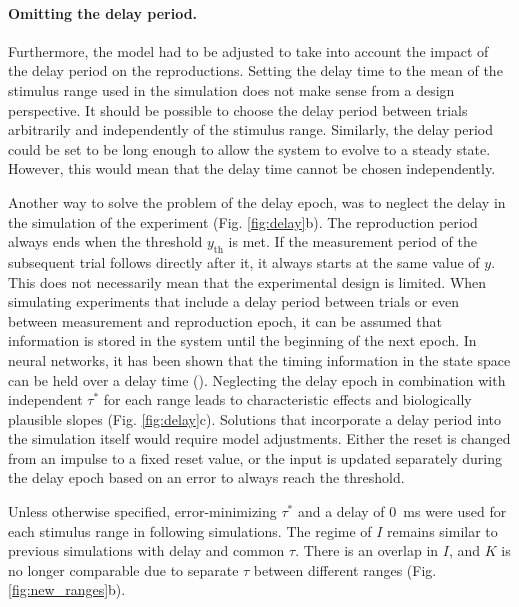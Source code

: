 \documentclass[10pt, a4paper]{article}
\begin{document}
\paragraph{Omitting the delay period.}
Furthermore, the model had to be adjusted to take into account the impact of the delay period on the reproductions. 
Setting the delay time to the mean of the stimulus range used in the simulation does not make sense from a design perspective. It should be possible to choose the delay period between trials arbitrarily and independently of the stimulus range. 
Similarly, the delay period could be set to be long enough to allow the system to evolve to a steady state. However, this would mean that the delay time cannot be chosen independently.

Another way to solve the problem of the delay epoch, was to neglect the delay in the simulation of the experiment (Fig. \ref{fig:delay}b).
The reproduction period always ends when the threshold $y_\text{th}$ is met. If the measurement period of the subsequent trial follows directly after it, it always starts at the same value of $y$. 
This does not necessarily mean that the experimental design is limited. When simulating experiments that include a delay period between trials or even between measurement and reproduction epoch, it can be assumed that information is stored in the system until the beginning of the next epoch. 
In neural networks, it has been shown that the timing information in the state space can be held over a delay time (\cite{Bi2020}).
Neglecting the delay epoch in combination with independent $\tau^*$ for each range leads to characteristic effects and biologically plausible slopes (Fig. \ref{fig:delay}c).
Solutions that incorporate a delay period into the simulation itself would require model adjustments.
Either the reset is changed from an impulse to a fixed reset value, or the input is updated separately during the delay epoch based on an error to always reach the threshold. 

Unless otherwise specified, error-minimizing $\tau^*$ and a delay of 0~ms were used for each stimulus range in following simulations. The regime of $I$ remains similar to previous simulations with delay and common $\tau$. There is an overlap in $I$, and $K$ is no longer comparable due to separate $\tau$ between different ranges (Fig. \ref{fig:new_ranges}b).
\end{document}
